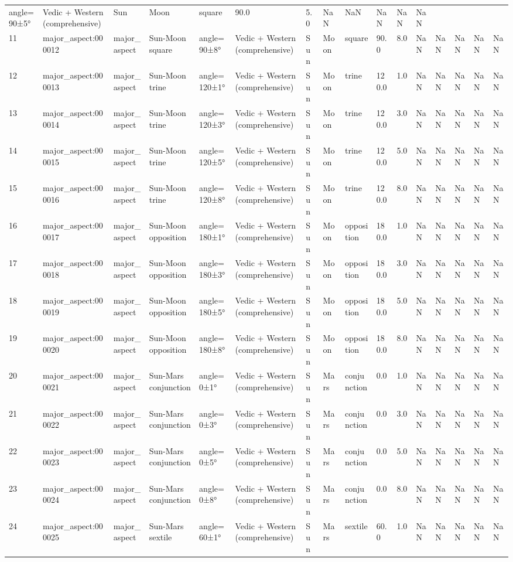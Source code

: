 \documentclass[
  11pt,
  a4paper,
  oneside,
  openany]{report}
\begin{document}
\begin{longtable}[]{@{}llllllllllllllll@{}}
angle=90±5° & Vedic + Western (comprehensive) & Sun & Moon & square &
90.0 & 5.0 & NaN & NaN & NaN & NaN & NaN \\
11 & major\_aspect:000012 & major\_aspect & Sun-Moon square &
angle=90±8° & Vedic + Western (comprehensive) & Sun & Moon & square &
90.0 & 8.0 & NaN & NaN & NaN & NaN & NaN \\
12 & major\_aspect:000013 & major\_aspect & Sun-Moon trine &
angle=120±1° & Vedic + Western (comprehensive) & Sun & Moon & trine &
120.0 & 1.0 & NaN & NaN & NaN & NaN & NaN \\
13 & major\_aspect:000014 & major\_aspect & Sun-Moon trine &
angle=120±3° & Vedic + Western (comprehensive) & Sun & Moon & trine &
120.0 & 3.0 & NaN & NaN & NaN & NaN & NaN \\
14 & major\_aspect:000015 & major\_aspect & Sun-Moon trine &
angle=120±5° & Vedic + Western (comprehensive) & Sun & Moon & trine &
120.0 & 5.0 & NaN & NaN & NaN & NaN & NaN \\
15 & major\_aspect:000016 & major\_aspect & Sun-Moon trine &
angle=120±8° & Vedic + Western (comprehensive) & Sun & Moon & trine &
120.0 & 8.0 & NaN & NaN & NaN & NaN & NaN \\
16 & major\_aspect:000017 & major\_aspect & Sun-Moon opposition &
angle=180±1° & Vedic + Western (comprehensive) & Sun & Moon & opposition
& 180.0 & 1.0 & NaN & NaN & NaN & NaN & NaN \\
17 & major\_aspect:000018 & major\_aspect & Sun-Moon opposition &
angle=180±3° & Vedic + Western (comprehensive) & Sun & Moon & opposition
& 180.0 & 3.0 & NaN & NaN & NaN & NaN & NaN \\
18 & major\_aspect:000019 & major\_aspect & Sun-Moon opposition &
angle=180±5° & Vedic + Western (comprehensive) & Sun & Moon & opposition
& 180.0 & 5.0 & NaN & NaN & NaN & NaN & NaN \\
19 & major\_aspect:000020 & major\_aspect & Sun-Moon opposition &
angle=180±8° & Vedic + Western (comprehensive) & Sun & Moon & opposition
& 180.0 & 8.0 & NaN & NaN & NaN & NaN & NaN \\
20 & major\_aspect:000021 & major\_aspect & Sun-Mars conjunction &
angle=0±1° & Vedic + Western (comprehensive) & Sun & Mars & conjunction
& 0.0 & 1.0 & NaN & NaN & NaN & NaN & NaN \\
21 & major\_aspect:000022 & major\_aspect & Sun-Mars conjunction &
angle=0±3° & Vedic + Western (comprehensive) & Sun & Mars & conjunction
& 0.0 & 3.0 & NaN & NaN & NaN & NaN & NaN \\
22 & major\_aspect:000023 & major\_aspect & Sun-Mars conjunction &
angle=0±5° & Vedic + Western (comprehensive) & Sun & Mars & conjunction
& 0.0 & 5.0 & NaN & NaN & NaN & NaN & NaN \\
23 & major\_aspect:000024 & major\_aspect & Sun-Mars conjunction &
angle=0±8° & Vedic + Western (comprehensive) & Sun & Mars & conjunction
& 0.0 & 8.0 & NaN & NaN & NaN & NaN & NaN \\
24 & major\_aspect:000025 & major\_aspect & Sun-Mars sextile &
angle=60±1° & Vedic + Western (comprehensive) & Sun & Mars & sextile &
60.0 & 1.0 & NaN & NaN & NaN & NaN & NaN \\
\end{longtable}
\end{document}
